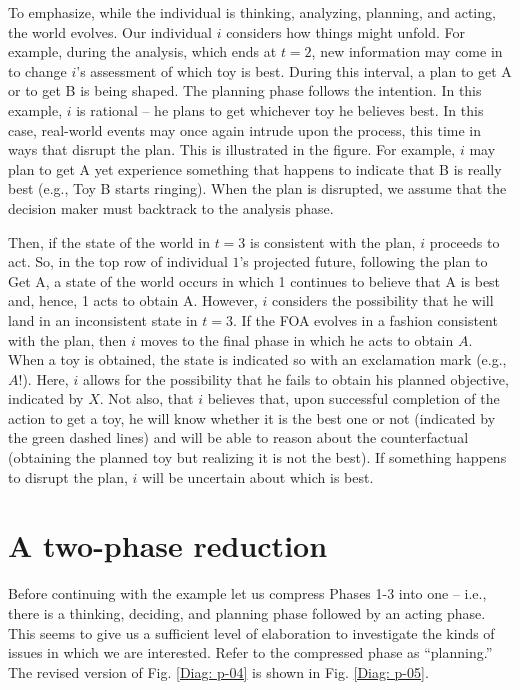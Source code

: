 \documentclass[
11pt,
titlepage,
reqno,
]{article}%
\theoremstyle{definition}
\begin{document}
To emphasize, while the individual is thinking, analyzing, planning, and acting, the world evolves. Our individual $i$ considers how things might unfold. For example, during the analysis, which ends at $t=2$, new information may come in to change $i$'s assessment of which toy is best. During this interval, a plan to get A or to get B is being shaped. The planning phase follows the intention. In this example, $i$ is rational -- he plans to get whichever toy he believes best. In this case, real-world events may once again intrude upon the process, this time in ways that disrupt the plan. This is illustrated in the figure. For example, $i$ may plan to get A yet experience something that happens to indicate that B is really best (e.g., Toy B starts  ringing). When the plan is disrupted, we assume that the decision maker must backtrack to the analysis phase.

Then, if the state of the world in $t=3$ is consistent with the plan, $i$ proceeds to act. So, in the top row of individual $1$'s projected future, following the plan to Get A, a state of the world occurs in which 1 continues to believe that A is best and, hence, 1 acts to obtain A. However, $i$ considers the possibility that he will land in an inconsistent state in $t=3$. If the FOA evolves in a fashion consistent with the plan, then $i$ moves to the final phase in which he acts to obtain $A$. When a toy is obtained, the state is indicated so with an exclamation mark (e.g., $A!$). Here, $i$ allows for the possibility that he fails to obtain his planned objective, indicated by $X$. Not also, that $i$ believes that, upon successful completion of the action to get a toy, he will know whether it is the best one or not (indicated by the green dashed lines) and will be able to reason about the counterfactual (obtaining the planned toy but realizing it is not the best). If something happens to disrupt the plan, $i$ will be uncertain about which is best.

\section*{A two-phase reduction}
Before continuing with the example let us compress Phases 1-3  into one -- i.e., there is a thinking, deciding, and planning phase followed by an acting phase. This seems to give us a sufficient level of elaboration to investigate the kinds of issues in which we are interested. Refer to the compressed phase as ``planning.'' The revised version of Fig. \ref{Diag: p-04} is shown in Fig. \ref{Diag: p-05}.
 
\end{document}

